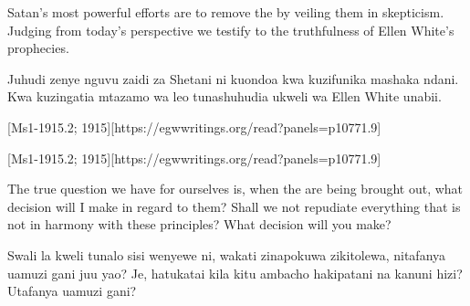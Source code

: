Satan's most powerful efforts are to remove the  by veiling them in skepticism. Judging from today’s perspective we testify to the truthfulness of Ellen White’s prophecies.


Juhudi zenye nguvu zaidi za Shetani ni kuondoa  kwa kuzifunika mashaka ndani. Kwa kuzingatia mtazamo wa leo tunashuhudia ukweli wa Ellen White unabii.


[Ms1-1915.2; 1915][https://egwwritings.org/read?panels=p10771.9]


[Ms1-1915.2; 1915][https://egwwritings.org/read?panels=p10771.9]


The true question we have for ourselves is, when the  are being brought out, what decision will I make in regard to them? Shall we not repudiate everything that is not in harmony with these principles? What decision will you make?


Swali la kweli tunalo sisi wenyewe ni, wakati  zinapokuwa zikitolewa, nitafanya uamuzi gani juu yao? Je, hatukatai kila kitu ambacho hakipatani na kanuni hizi? Utafanya uamuzi gani?






